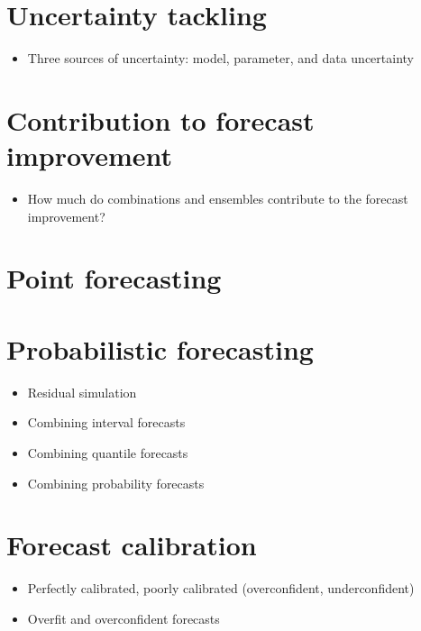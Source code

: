 \documentclass[11pt]{article}
\begin{document}
\section{Uncertainty tackling}
\begin{itemize}
\item Three sources of uncertainty: model, parameter, and data uncertainty
\end{itemize}


\section{Contribution to forecast improvement}
\begin{itemize}
\item How much do combinations and ensembles contribute to the forecast improvement?
\end{itemize}


\section{Point forecasting}


\section{Probabilistic forecasting}
\begin{itemize}
\item Residual simulation
\item Combining interval forecasts
\item Combining quantile forecasts
\item Combining probability forecasts
\end{itemize}


\section{Forecast calibration}
\begin{itemize}
\item Perfectly calibrated, poorly calibrated (overconfident, underconfident)
\item Overfit and overconfident forecasts
\end{itemize}




\end{document}
